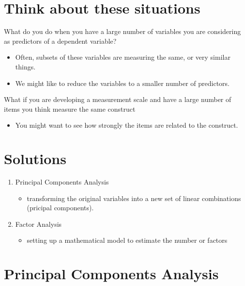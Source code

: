 \documentclass[
]{book}
\providecommand{\tightlist}{%
  \setlength{\itemsep}{0pt}\setlength{\parskip}{0pt}}
\begin{document}
\hypertarget{think-about-these-situations}{%
\section{Think about these situations}\label{think-about-these-situations}}

What do you do when you have a large number of variables you are considering as predictors of a dependent variable?

\begin{itemize}
\tightlist
\item
  Often, subsets of these variables are measuring the same, or very similar things.
\item
  We might like to reduce the variables to a smaller number of predictors.
\end{itemize}

What if you are developing a measurement scale and have a large number of items you think measure the same construct

\begin{itemize}
\tightlist
\item
  You might want to see how strongly the items are related to the construct.
\end{itemize}

\hypertarget{solutions}{%
\section{Solutions}\label{solutions}}

\begin{enumerate}
\def\labelenumi{\arabic{enumi}.}
\item
  Principal Components Analysis

  \begin{itemize}
  \tightlist
  \item
    transforming the original variables into a new set of linear combinations (pricipal components).
  \end{itemize}
\item
  Factor Analysis

  \begin{itemize}
  \tightlist
  \item
    setting up a mathematical model to estimate the number or factors
  \end{itemize}
\end{enumerate}

\hypertarget{principal-components-analysis}{%
\section{Principal Components Analysis}\label{principal-components-analysis}}
\end{document}
